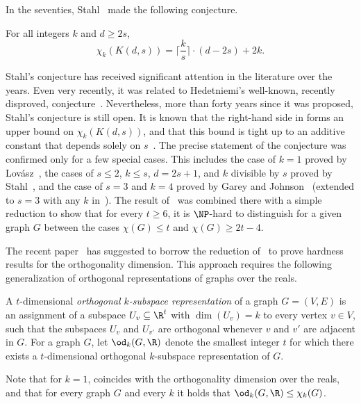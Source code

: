 In the seventies, Stahl~\cite{Stahl76} made the following conjecture.
\begin{conjecture}\label{conj:Stahl}
For all integers $k$ and $d \geq 2s$,
\[\chi_k(K(d,s)) = \Big \lceil \frac{k}{s} \Big \rceil \cdot (d-2s)+2k.\]
\end{conjecture}
\noindent
Stahl's conjecture has received significant attention in the literature over
the years. Even very recently, it was related to
%
%
Hedetniemi's well-known, recently disproved, conjecture~\cite{TradifZ19}. %
Nevertheless, more than forty years since it was proposed, Stahl's conjecture
is still open.
It is known that the right-hand side in  forms an upper bound on $\chi_k(K(d,s))$, and that this bound is tight up to an additive constant that depends solely on $s$~\cite{CGJ78,Stahl98}.
The precise statement of the conjecture was confirmed only for a few special cases. This includes the case of $k=1$ proved by Lov\'asz~\cite{LovaszKneser}, the cases of $s \leq 2$, $k \leq s$, $d=2s+1$, and $k$ divisible by $s$ proved by Stahl~\cite{Stahl76,Stahl98}, and the case of $s=3$ and $k=4$ proved by Garey and Johnson~\cite{GareyJ76a} (extended to $s=3$ with any $k$ in~\cite{Stahl98}). The result of~\cite{GareyJ76a} was combined there with a simple reduction to show that for every $t \geq 6$, it is $\NP$-hard 
%
%
to distinguish for a given graph $G$ between the cases $\chi(G) \leq t$ and $\chi(G) \geq 2t-4$.

The recent %
paper~\cite{HavivMFCS19}  %
has suggested to borrow the reduction of~\cite{GareyJ76a} to prove hardness results for the orthogonality dimension.
%
%
This approach requires the following generalization of orthogonal representations of graphs over the reals.

\begin{definition}\label{def:ortho_k-subspace}
%
%
A $t$-dimensional \emph{orthogonal $k$-subspace representation} of a graph $G=(V,E)$ is an assignment of a subspace $U_v \subseteq \R^t$ with $\dim (U_v)=k$ to every vertex $v \in V$, such that the subspaces $U_v$ and $U_{v'}$ are orthogonal whenever $v$ and $v'$ are adjacent in $G$. For a graph $G$, let $\od_k(G,\R)$ denote the smallest integer $t$ for which there exists a $t$-dimensional orthogonal $k$-subspace representation of $G$.
\end{definition}
\noindent
Note that for $k=1$,  coincides with the orthogonality dimension over the reals, and that for every graph $G$ and every $k$ it holds that $\od_k(G,\R) \leq \chi_k(G)$.


